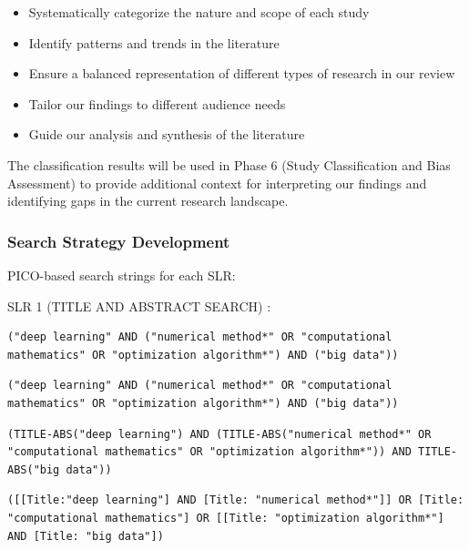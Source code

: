 \documentclass[acmsmall]{acmart}
\begin{document}
\begin{itemize}
    \item Systematically categorize the nature and scope of each study
    \item Identify patterns and trends in the literature
    \item Ensure a balanced representation of different types of research in our review
    \item Tailor our findings to different audience needs
    \item Guide our analysis and synthesis of the literature
\end{itemize}

The classification results will be used in Phase 6 (Study Classification and Bias Assessment) to provide additional context for interpreting our findings and identifying gaps in the current research landscape.

\subsubsection{Search Strategy Development}\label{subsubsec:phase-1-planning-and-protocol-development:search-strategy-development}
PICO-based search strings for each SLR:

SLR 1 (TITLE AND ABSTRACT SEARCH) :

\begin{lstlisting}[caption={General Search String},label={lst:general_search}]
    ("deep learning" AND ("numerical method*" OR "computational mathematics" OR "optimization algorithm*") AND ("big data"))
\end{lstlisting}

\begin{lstlisting}[caption={IEEE Explore Search String},label={lst:iee_explore}]
    ("deep learning" AND ("numerical method*" OR "computational mathematics" OR "optimization algorithm*") AND ("big data"))
\end{lstlisting}

\begin{lstlisting}[caption={Scopus Search String},label={lst:scopus}]
    (TITLE-ABS("deep learning") AND (TITLE-ABS("numerical method*" OR "computational mathematics" OR "optimization algorithm*")) AND TITLE-ABS("big data"))
\end{lstlisting}

\begin{lstlisting}[caption={Aisel Search String},label={lst:aisel}]
    ([[Title:"deep learning"] AND [Title: "numerical method*"]] OR [Title: "computational mathematics"] OR [[Title: "optimization algorithm*"] AND [Title: "big data"])
\end{lstlisting}
\end{document}

